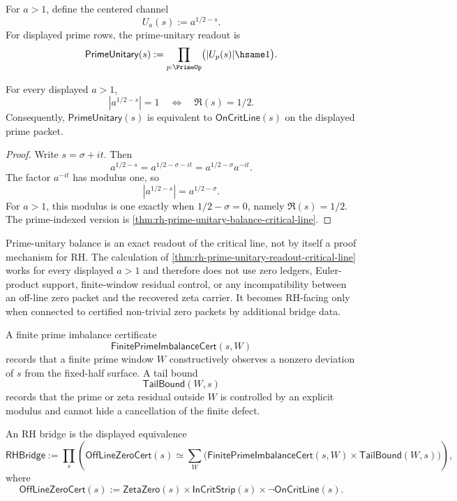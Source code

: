 \begin{definition}
\label{def:rh-prime-unitary-readout-boundary}
For $a>1$, define the centered channel
$$
U_a(s):=a^{1/2-s}.
$$
For displayed prime rows, the prime-unitary readout is
$$
\mathsf{PrimeUnitary}(s)
:=
\prod_{p:\PrimeUp}
\bigl(|U_p(s)|\hsame1\bigr).
$$
\end{definition}

\begin{theorem}
\label{thm:rh-prime-unitary-readout-critical-line}
For every displayed $a>1$,
$$
|a^{1/2-s}|=1
\quad\Longleftrightarrow\quad
\Re(s)=1/2.
$$
Consequently, $\mathsf{PrimeUnitary}(s)$ is equivalent to
$\mathsf{OnCritLine}(s)$ on the displayed prime packet.
\end{theorem}

\begin{proof}
Write $s=\sigma+it$. Then
$$
a^{1/2-s}=a^{1/2-\sigma-it}
=a^{1/2-\sigma}a^{-it}.
$$
The factor $a^{-it}$ has modulus one, so
$$
|a^{1/2-s}|=a^{1/2-\sigma}.
$$
For $a>1$, this modulus is one exactly when $1/2-\sigma=0$, namely
$\Re(s)=1/2$. The prime-indexed version is
\autoref{thm:rh-prime-unitary-balance-critical-line}.
\end{proof}

\begin{principle}
\label{prin:rh-prime-unitary-not-rh-mechanism}
Prime-unitary balance is an exact readout of the critical line, not by
itself a proof mechanism for RH. The calculation of
\autoref{thm:rh-prime-unitary-readout-critical-line} works for every
displayed $a>1$ and therefore does not use zero ledgers, Euler-product
support, finite-window residual control, or any incompatibility between an
off-line zero packet and the recovered zeta carrier. It becomes RH-facing
only when connected to certified non-trivial zero packets by additional
bridge data.
\end{principle}

\begin{definition}
\label{def:rh-finite-prime-imbalance-bridge}
A finite prime imbalance certificate
$$
\mathsf{FinitePrimeImbalanceCert}(s,W)
$$
records that a finite prime window $W$ constructively observes a nonzero
deviation of $s$ from the fixed-half surface. A tail bound
$$
\mathsf{TailBound}(W,s)
$$
records that the prime or zeta residual outside $W$ is controlled by an
explicit modulus and cannot hide a cancellation of the finite defect.

An RH bridge is the displayed equivalence
$$
\mathsf{RHBridge}
:=
\prod_s
\left(
\mathsf{OffLineZeroCert}(s)
\simeq
\sum_W
\bigl(
\mathsf{FinitePrimeImbalanceCert}(s,W)
\times
\mathsf{TailBound}(W,s)
\bigr)
\right),
$$
where
$$
\mathsf{OffLineZeroCert}(s)
:=
\mathsf{ZetaZero}(s)
\times
\mathsf{InCritStrip}(s)
\times
\neg\mathsf{OnCritLine}(s).
$$
\end{definition}

